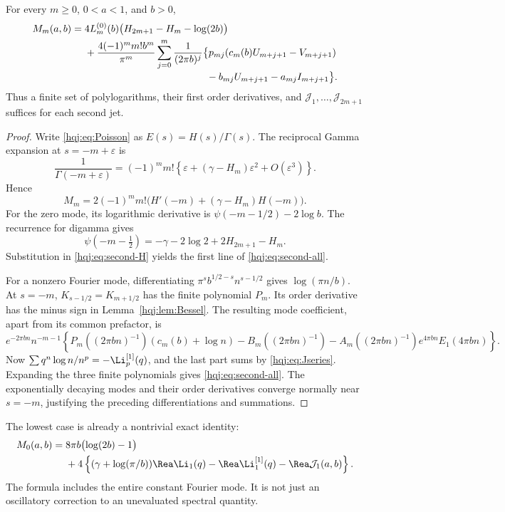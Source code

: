 \begin{theorem}\label{hqj:thm:second}
For every $m\ge0$, $0<a<1$, and $b>0$,
\begin{align}
M_m(a,b)={}&4L_m^{(0)}(b)
\bigl(H_{2m+1}-H_m-\log(2b)\bigr)\notag\\
&+\frac{4(-1)^m m!b^m}{\pi^m}
\sum_{j=0}^m\frac1{(2\pi b)^j}
\bigl\{p_{mj}(c_m(b)U_{m+j+1}-V_{m+j+1})\notag\\[-2pt]
&\hspace{43mm}-b_{mj}U_{m+j+1}-a_{mj}I_{m+j+1}\bigr\}.
\label{hqj:eq:second-all}
\end{align}
Thus a finite set of polylogarithms, their first order derivatives, and
$\mathcal J_1,\ldots,\mathcal J_{2m+1}$ suffices for each second jet.
\end{theorem}
\begin{proof}
Write \eqref{hqj:eq:Poisson} as $E(s)=H(s)/\Gamma(s)$.
The reciprocal Gamma expansion at $s=-m+\varepsilon$ is
\[
\frac1{\Gamma(-m+\varepsilon)}
=(-1)^mm!\left\{\varepsilon+(\gamma-H_m)\varepsilon^2
+O(\varepsilon^3)\right\}.
\]
Hence
\begin{equation}\label{hqj:eq:second-H}
M_m=2(-1)^mm!\bigl(H'(-m)+(\gamma-H_m)H(-m)\bigr).
\end{equation}
For the zero mode, its logarithmic derivative is
$\psi(-m-1/2)-2\log b$. The recurrence for digamma gives
\[
\psi(-m-\tfrac12)=-\gamma-2\log2+2H_{2m+1}-H_m.
\]
Substitution in \eqref{hqj:eq:second-H} yields the first line of
\eqref{hqj:eq:second-all}.

For a nonzero Fourier mode, differentiating
$\pi^s b^{1/2-s}n^{s-1/2}$ gives $\log(\pi n/b)$.
At $s=-m$, $K_{s-1/2}=K_{m+1/2}$ has the finite polynomial $P_m$.
Its order derivative has the minus sign in Lemma~\ref{hqj:lem:Bessel}.
The resulting mode coefficient, apart from its common prefactor, is
\[
e^{-2\pi bn}n^{-m-1}
\left\{P_m((2\pi bn)^{-1})(c_m(b)+\log n)
-B_m((2\pi bn)^{-1})
-A_m((2\pi bn)^{-1})e^{4\pi bn}E_1(4\pi bn)\right\}.
\]
Now
$\sum q^n\log n/n^p=-\Li_p^{[1]}(q)$, and the last part sums by
\eqref{hqj:eq:Jseries}. Expanding the three finite polynomials gives
\eqref{hqj:eq:second-all}. The exponentially decaying modes and their
order derivatives converge normally near $s=-m$, justifying the
preceding differentiations and summations.
\end{proof}

The lowest case is already a nontrivial exact identity:
\begin{align}
M_0(a,b)={}&8\pi b\bigl(\log(2b)-1\bigr)\notag\\
&+4\left\{(\gamma+\log(\pi/b))\Rea\Li_1(q)
-\Rea\Li_1^{[1]}(q)-\Rea\mathcal J_1(a,b)\right\}.
\label{hqj:eq:M0}
\end{align}
The formula includes the entire constant Fourier mode. It is not just
an oscillatory correction to an unevaluated spectral quantity.

